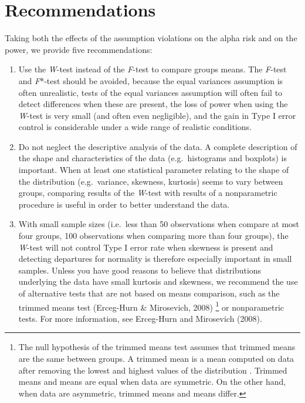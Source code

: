 \documentclass[man,floatsintext]{apa6}
\providecommand{\tightlist}{%
  \setlength{\itemsep}{0pt}\setlength{\parskip}{0pt}}
\let\rmarkdownfootnote\footnote%
\def\footnote{\protect\rmarkdownfootnote}
\begin{document}
\hypertarget{recommendations}{%
\section{Recommendations}\label{recommendations}}

Taking both the effects of the assumption violations on the alpha risk and on the power, we provide five recommendations:

\begin{enumerate}
\def\labelenumi{\arabic{enumi}.}
\tightlist
\item
  Use the \emph{W}-test instead of the \emph{F}-test to compare groups means. The \emph{F}-test and \emph{F}*-test should be avoided, because the equal variances assumption is often unrealistic, tests of the equal variances assumption will often fail to detect differences when these are present, the loss of power when using the \emph{W}-test is very small (and often even negligible), and the gain in Type I error control is considerable under a wide range of realistic conditions.
\item
  Do not neglect the descriptive analysis of the data. A complete description of the shape and characteristics of the data (e.g.~histograms and boxplots) is important. When at least one statistical parameter relating to the shape of the distribution (e.g.~variance, skewness, kurtosis) seems to vary between groups, comparing results of the \emph{W}-test with results of a nonparametric procedure is useful in order to better understand the data.\\
\item
  With small sample sizes (i.e.~less than 50 observations when compare at most four groups, 100 observations when comparing more than four groups), the \emph{W}-test will not control Type I error rate when skewness is present and detecting departures for normality is therefore especially important in small samples. Unless you have good reasons to believe that distributions underlying the data have small kurtosis and skewness, we recommend the use of alternative tests that are not based on means comparison, such as the trimmed means test (Erceg-Hurn \& Mirosevich, 2008) \footnote{The null hypothesis of the trimmed means test assumes that trimmed means are the same between groups. A trimmed mean is a mean computed on data after removing the lowest and highest values of the distribution . Trimmed means and means are equal when data are symmetric. On the other hand, when data are asymmetric, trimmed means and means differ.} or nonparametric tests. For more information, see Erceg-Hurn and Mirosevich (2008).

\end{enumerate}
\end{document}

